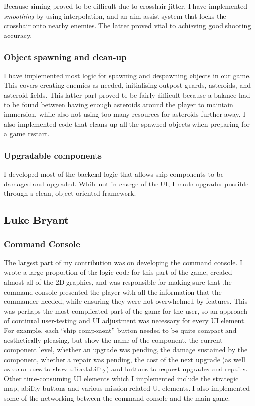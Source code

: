 \documentclass[a4paper,11pt]{article}
\begin{document}
Because aiming proved to be difficult due to crosshair jitter, I have implemented \emph{smoothing} by using interpolation, and an aim assist system that locks the crosshair onto nearby enemies. The latter proved vital to achieving good shooting accuracy.

\subsubsection{Object spawning and clean-up}

I have implemented most logic for spawning and despawning objects in our game. This covers creating enemies as needed, initialising outpost guards, asteroids, and asteroid fields. This latter part proved to be fairly difficult because a balance had to be found between having enough asteroids around the player to maintain immersion, while also not using too many resources for asteroids further away. I also implemented code that cleans up all the spawned objects when preparing for a game restart.

\subsubsection{Upgradable components}

I developed most of the backend logic that allows ship components to be damaged and upgraded. While not in charge of the UI, I made upgrades possible through a clean, object-oriented framework.

\clearpage

\subsection{Luke Bryant}

\subsubsection{Command Console}

The largest part of my contribution was on developing the command console. I wrote a large proportion of the logic code for this part of the game, created almost all of the 2D graphics, and was responsible for making sure that the command console presented the player with all the information that the commander needed, while ensuring they were not overwhelmed by features. This was perhaps the most complicated part of the game for the user, so an approach of continual user-testing and UI adjustment was necessary for every UI element. For example, each “ship component” button needed to be quite compact and aesthetically pleasing, but show the name of the component, the current component level, whether an upgrade was pending, the damage sustained by the component, whether a repair was pending, the cost of the next upgrade (as well as color cues to show affordability) and buttons to request upgrades and repairs. Other time-consuming UI elements which I implemented include the strategic map, ability buttons and various mission-related UI elements. I also implemented some of the networking between the command console and the main game.
\end{document}
